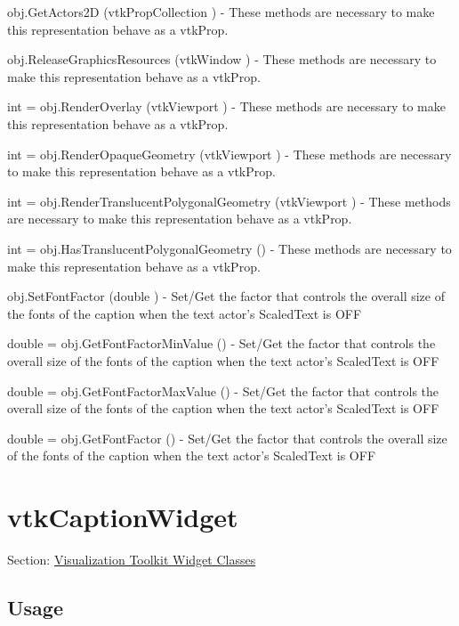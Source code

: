 \begin{DoxyItemize}
\item {\ttfamily obj.\-Get\-Actors2\-D (vtk\-Prop\-Collection )} -\/ These methods are necessary to make this representation behave as a vtk\-Prop.  
\item {\ttfamily obj.\-Release\-Graphics\-Resources (vtk\-Window )} -\/ These methods are necessary to make this representation behave as a vtk\-Prop.  
\item {\ttfamily int = obj.\-Render\-Overlay (vtk\-Viewport )} -\/ These methods are necessary to make this representation behave as a vtk\-Prop.  
\item {\ttfamily int = obj.\-Render\-Opaque\-Geometry (vtk\-Viewport )} -\/ These methods are necessary to make this representation behave as a vtk\-Prop.  
\item {\ttfamily int = obj.\-Render\-Translucent\-Polygonal\-Geometry (vtk\-Viewport )} -\/ These methods are necessary to make this representation behave as a vtk\-Prop.  
\item {\ttfamily int = obj.\-Has\-Translucent\-Polygonal\-Geometry ()} -\/ These methods are necessary to make this representation behave as a vtk\-Prop.  
\item {\ttfamily obj.\-Set\-Font\-Factor (double )} -\/ Set/\-Get the factor that controls the overall size of the fonts of the caption when the text actor's Scaled\-Text is O\-F\-F  
\item {\ttfamily double = obj.\-Get\-Font\-Factor\-Min\-Value ()} -\/ Set/\-Get the factor that controls the overall size of the fonts of the caption when the text actor's Scaled\-Text is O\-F\-F  
\item {\ttfamily double = obj.\-Get\-Font\-Factor\-Max\-Value ()} -\/ Set/\-Get the factor that controls the overall size of the fonts of the caption when the text actor's Scaled\-Text is O\-F\-F  
\item {\ttfamily double = obj.\-Get\-Font\-Factor ()} -\/ Set/\-Get the factor that controls the overall size of the fonts of the caption when the text actor's Scaled\-Text is O\-F\-F  
\end{DoxyItemize}\hypertarget{vtkwidgets_vtkcaptionwidget}{}\section{vtk\-Caption\-Widget}\label{vtkwidgets_vtkcaptionwidget}
Section\-: \hyperlink{sec_vtkwidgets}{Visualization Toolkit Widget Classes} \hypertarget{vtkwidgets_vtkxyplotwidget_Usage}{}\subsection{Usage}\label{vtkwidgets_vtkxyplotwidget_Usage}
